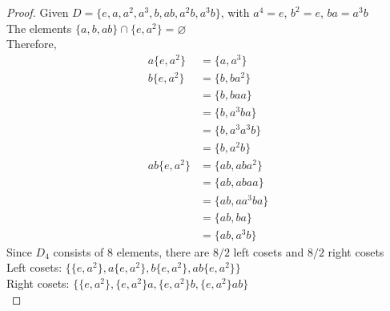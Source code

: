 \documentclass[paper=usletter, fontsize=12pt]{article}
\begin{document}
\begin{itemize}
\begin{enumerate}
\begin{proof}
                Given $D = \{e,a,a^2,a^3,b,ab,a^2b,a^3b\}$, with $a^4=e$, $b^2=e$, $ba=a^3b$\\
                The elements $\{a,b,ab\} \cap \{e, a^2\} =\varnothing$\\
                Therefore,
                \begin{align*}
                    a\{e, a^2\} &= \{a, a^3\}\\
                    b\{e, a^2\} &= \{b, ba^2\}\\
                    &= \{b, baa\}\\
                    &= \{b, a^3ba\}\\
                    &= \{b, a^3a^3b\}\\
                    &= \{b, a^2b\}\\
                    ab\{e, a^2\} &= \{ab, aba^2\}\\
                    &= \{ab, abaa\}\\
                    &= \{ab, aa^3ba\}\\
                    &= \{ab, ba\}\\
                    &= \{ab, a^3b\}
                \end{align*}
                Since $D_4$ consists of 8 elements, there are $8/2$ left cosets
                and $8/2$ right cosets\\ Left cosets: $\{\{e, a^2\},a\{e,
                a^2\},b\{e, a^2\},ab\{e, a^2\}\}$\\ Right cosets: $\{\{e,
                a^2\},\{e, a^2\}a,\{e, a^2\}b,\{e, a^2\}ab\}$\\


\end{proof}
\end{enumerate}
\end{itemize}
\end{document}
